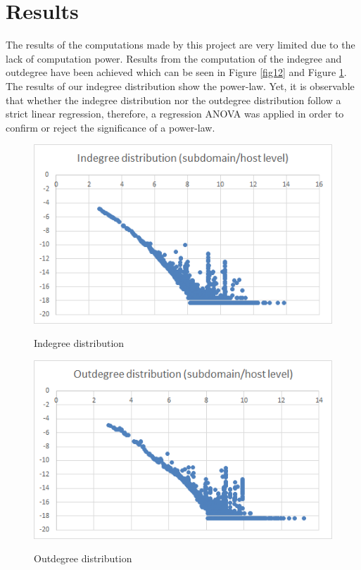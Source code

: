 \section{Results}
The results of the computations made by this project are very limited due to the lack of computation power. Results from the computation of the indegree and outdegree have been achieved which can be seen in Figure \ref{fig12} and Figure \ref{fig13}. The results of our indegree distribution show the power-law. Yet, it is observable that whether the indegree distribution nor the outdegree distribution follow a strict linear regression, therefore, a regression ANOVA was applied in order to confirm or reject the significance of a power-law.

\begin{figure}[H]
\begin{minipage}{.5\textwidth}
	\begin{center}
		\label{fig12}		
		\includegraphics[width=1.0\textwidth]{fig12}	
		\caption{Indegree distribution}	
	\end{center}
\end{minipage} %
\begin{minipage}{.5\textwidth}
	\begin{center}
		\label{fig13}		
		\includegraphics[width=1.0\textwidth]{fig13}	
		\caption{Outdegree distribution}	
	\end{center}
\end{minipage}
\end{figure}

